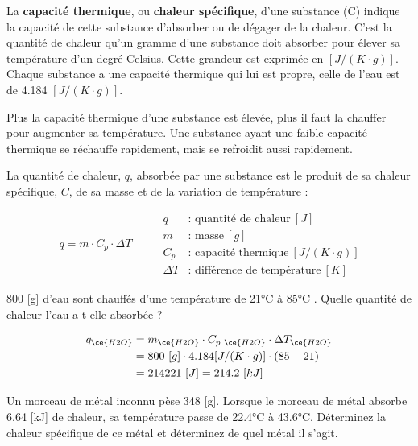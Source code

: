 \documentclass[
  11pt,
  a4paper,
  openany]{book}
\begin{document}
La \textbf{capacité thermique}, ou \textbf{chaleur spécifique}, d'une substance (C) indique la capacité de cette substance d'absorber ou de dégager de la chaleur. C'est la quantité de chaleur qu'un gramme d'une substance doit absorber pour élever sa température d'un degré Celsius. Cette grandeur est exprimée en \([J/(K \cdot g)]\). Chaque substance a une capacité thermique qui lui est propre, celle de l'eau est de 4.184 \([J/(K \cdot g)]\).

Plus la capacité thermique d'une substance est élevée, plus il faut la chauffer pour augmenter sa température. Une substance ayant une faible capacité thermique se réchauffe rapidement, mais se refroidit aussi rapidement.

La quantité de chaleur, \(q\), absorbée par une substance est le produit de sa chaleur spécifique, \(C\), de sa masse et de la variation de température :

\[
\begin{split}
q = m \cdot C_p \cdot \Delta T
\end{split}
\qquad
\begin{split}
q & \text{: quantité de chaleur}\ [J] \\
m & \text{: masse}\ [g] \\
C_p & \text{: capacité thermique}\ [J/(K \cdot g)] \\
\Delta T & \text{: différence de température}\ [K]
\end{split}
\]

\begin{Exercise}

800 {[}g{]} d'eau sont chauffés d'une température de 21°C à 85°C . Quelle quantité de chaleur l'eau a-t-elle absorbée ?


\end{Exercise}

\begin{Answer}
\[
\begin{split}
q_{\ce{H2O}} &= m_{\ce{H2O}} \cdot C_{p\ \ce{H2O}} \cdot \Delta T_{\ce{H2O}} \\
 &= 800\ [g] \cdot 4.184 [J/(K \cdot g)] \cdot (85-21) \\
 &= 214221\ [J] =  214.2\ [kJ]
\end{split}
\]

\end{Answer}

\clearpage

\begin{Exercise}

Un morceau de métal inconnu pèse 348 {[}g{]}. Lorsque le morceau de métal absorbe 6.64 {[}kJ{]} de chaleur, sa température passe de 22.4°C à 43.6°C. Déterminez la chaleur spécifique de ce métal et déterminez de quel métal il s'agit.


\end{Exercise}
\end{document}
